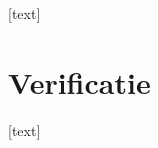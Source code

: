 \documentclass{article}
\begin{document}
		[text]

	
	\newpage

	
	\section{Verificatie}


		[text]

	
	\newpage
	
	
	 
	
\end{document}
